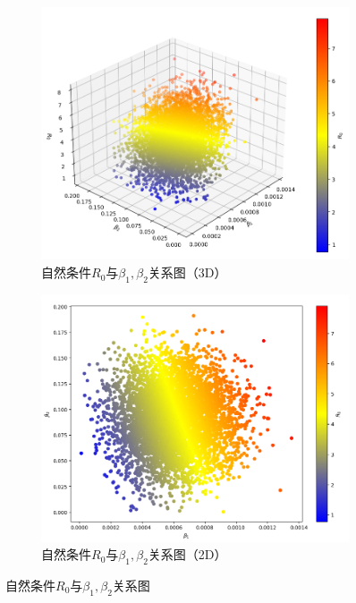 \documentclass{ctexart}
\begin{document}
    \begin{figure}[H]
        \centering
        \begin{subfigure}[b]{0.49\linewidth}
            \includegraphics[width=\linewidth]{3.2.1.png}
            \caption{自然条件$R_{0}$与$\beta_{1},\beta_{2}$关系图（3D）}
            \label{fig.3.2.1}
        \end{subfigure}
        \begin{subfigure}[b]{0.49\linewidth}
            \includegraphics[width=\linewidth]{3.2.2.png}
            \caption{自然条件$R_{0}$与$\beta_{1},\beta_{2}$关系图（2D）}
            \label{fig.3.2.2}
        \end{subfigure}
        \caption{自然条件$R_{0}$与$\beta_{1},\beta_{2}$关系图}
        \label{fig.3.2.1-2}
    \end{figure}
\end{document}
